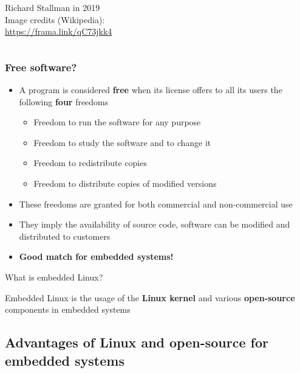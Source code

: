 \begin{frame}
\begin{columns}
      \scriptsize
      Richard Stallman in 2019\\
      \tiny
      Image credits (Wikipedia):\\
      \url{https://frama.link/qC73jkk4}
    \end{columns}

\end{frame}

\begin{frame}
  \frametitle{Free software?}
  \begin{itemize}
  \item A program is considered {\bf free} when its license offers to
    all its users the following {\bf four} freedoms
    \begin{itemize}
    \item Freedom to run the software for any purpose
    \item Freedom to study the software and to change it
    \item Freedom to redistribute copies
    \item Freedom to distribute copies of modified versions
    \end{itemize}
  \item These freedoms are granted for both commercial and
    non-commercial use
  \item They imply the availability of source code, software can be
    modified and distributed to customers
  \item {\bf Good match for embedded systems!}
  \end{itemize}
\end{frame}

\begin{frame}{What is embedded Linux?}
  \huge
  \begin{center}
    Embedded Linux is the usage of the {\bf Linux kernel} and various
    {\bf open-source} components in embedded systems
  \end{center}
\end{frame}

\subsection[Why embedded Linux?]{Advantages of Linux and open-source
  for embedded systems}

